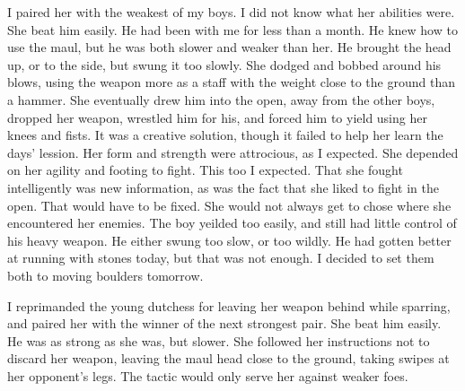 \documentclass{article}
\begin{document}
I paired her with the weakest of my boys. I did not know what her abilities were. She beat him easily. He had been with me for less than a month. He knew how to use the maul, but he was both slower and weaker than her. He brought the head up, or to the side, but swung it too slowly. She dodged and bobbed around his blows, using the weapon more as a staff with the weight close to the ground than a hammer. She eventually drew him into the open, away from the other boys, dropped her weapon, wrestled him for his, and forced him to yield using her knees and fists. It was a creative solution, though it failed to help her learn the days' lession. Her form and strength were attrocious, as I expected. She depended on her agility and footing to fight. This too I expected. That she fought intelligently was new information, as was the fact that she liked to fight in the open. That would have to be fixed. She would not always get to chose where she encountered her enemies. The boy yeilded too easily, and still had little control of his heavy weapon. He either swung too slow, or too wildly. He had gotten better at running with stones today, but that was not enough. I decided to set them both to moving boulders tomorrow.

I reprimanded the young dutchess for leaving her weapon behind while sparring, and paired her with the winner of the next strongest pair. She beat him easily. He was as strong as she was, but slower. She followed her instructions not to discard her weapon, leaving the maul head close to the ground, taking swipes at her opponent's legs. The tactic would only serve her against weaker foes. 
\end{document}
